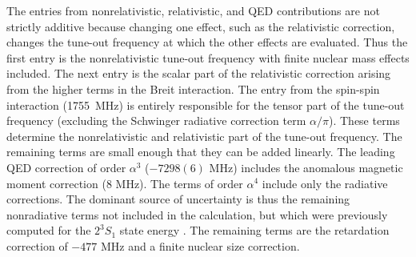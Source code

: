 	The entries from nonrelativistic, relativistic, and QED contributions are not strictly additive because changing one effect, such as the relativistic correction, changes the tune-out frequency at which the other effects are evaluated.  Thus the first entry is the nonrelativistic tune-out frequency with finite nuclear mass effects included.  The next entry is the scalar part of the relativistic correction arising from the higher terms in the Breit interaction.  The entry from the spin-spin interaction (1755~MHz) is entirely responsible for the tensor part of the tune-out frequency (excluding the Schwinger radiative correction term $\alpha/\pi$).  These terms determine the nonrelativistic and relativistic part of the tune-out frequency.  The remaining terms are small enough that they can be added linearly.  The leading QED correction of order $\alpha^3$ ($-7298(6)$ MHz) includes the anomalous magnetic moment correction (8 MHz).  The terms of order $\alpha^4$ include only the radiative corrections.  The dominant source of uncertainty is thus the remaining nonradiative terms not included in the calculation, but which were previously computed for the $2^3S_1$ state energy \cite{Pachucki06}.  The remaining terms are the retardation correction of $-477$ MHz and a finite nuclear size correction.

